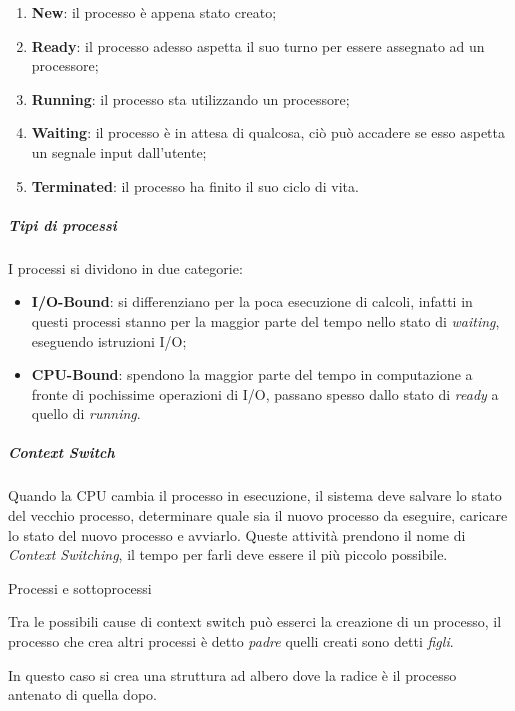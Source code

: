 \begin{enumerate}
\def\labelenumi{\arabic{enumi}.}
\item
  \textbf{New}: il processo è appena stato creato;
\item
  \textbf{Ready}: il processo adesso aspetta il suo turno per essere
  assegnato ad un processore;
\item
  \textbf{Running}: il processo sta utilizzando un processore;
\item
  \textbf{Waiting}: il processo è in attesa di qualcosa, ciò può
  accadere se esso aspetta un segnale input dall'utente;
\item
  \textbf{Terminated}: il processo ha finito il suo ciclo di vita.
\end{enumerate}

\subparagraph{\texorpdfstring{\emph{Tipi di
processi}}{Tipi di processi}}\label{tipi-di-processi}

I processi si dividono in due categorie:

\begin{itemize}
\item
  \textbf{I/O-Bound}: si differenziano per la poca esecuzione di
  calcoli, infatti in questi processi stanno per la maggior parte del
  tempo nello stato di \emph{waiting}, eseguendo istruzioni I/O;
\item
  \textbf{CPU-Bound}: spendono la maggior parte del tempo in
  computazione a fronte di pochissime operazioni di I/O, passano spesso
  dallo stato di \emph{ready} a quello di \emph{running}.
\end{itemize}

\subparagraph{\texorpdfstring{\emph{Context
Switch}}{Context Switch}}\label{context-switch}

Quando la CPU cambia il processo in esecuzione, il sistema deve salvare
lo stato del vecchio processo, determinare quale sia il nuovo processo
da eseguire, caricare lo stato del nuovo processo e avviarlo. Queste
attività prendono il nome di \emph{Context Switching}, il tempo per
farli deve essere il più piccolo possibile.

Processi e sottoprocessi

Tra le possibili cause di context switch può esserci la creazione di un
processo, il processo che crea altri processi è detto \emph{padre}
quelli creati sono detti \emph{figli}.

In questo caso si crea una struttura ad albero dove la radice è il
processo antenato di quella dopo.

